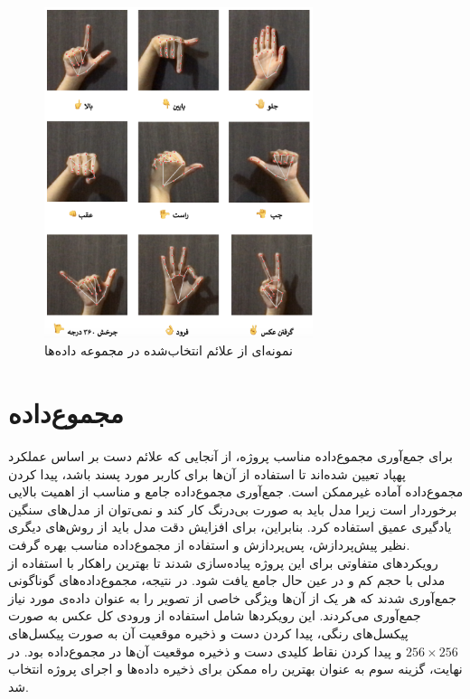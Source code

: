 \begin{figure}[h]
    \centering
    \includegraphics[width=0.7\textwidth]{gestures.png}
    \caption{نمونه‌ای از علائم انتخاب‌شده در مجموعه داده‌ها}
    \label{t}
\end{figure}

\section[مجموع‌داده]{مجموع‌داده \protect{}}
برای جمع‌آوری مجموع‌داده مناسب پروژه، از آنجایی که علائم دست بر اساس عملکرد پهپاد تعیین شده‌اند تا استفاده از آن‌ها برای کاربر مورد پسند باشد، پیدا کردن مجموع‌داده آماده غیرممکن است. جمع‌آوری مجموع‌داده جامع و مناسب از اهمیت
 بالایی برخوردار است زیرا مدل باید به صورت بی‌درنگ کار کند و نمی‌توان از مدل‌های سنگین یادگیری عمیق استفاده کرد. بنابراین، برای افزایش دقت مدل باید از روش‌های دیگری نظیر پیش‌پردازش، پس‌پردازش و استفاده از مجموع‌داده مناسب بهره گرفت.
\\
رویکردهای متفاوتی برای این پروژه پیاده‌سازی شدند تا بهترین راهکار با استفاده از مدلی با حجم کم و در عین حال جامع یافت شود. در نتیجه، مجموع‌داده‌های گوناگونی جمع‌آوری شدند که هر یک از آن‌ها ویژگی خاصی از تصویر
 را به عنوان داده‌ی مورد نیاز جمع‌آوری می‌کردند. این رویکردها شامل استفاده از ورودی کل عکس به صورت پیکسل‌های رنگی، پیدا کردن دست و ذخیره موقعیت آن به صورت پیکسل‌های $256 \times 256$ و پیدا کردن نقاط کلیدی دست و ذخیره موقعیت آن‌ها در مجموع‌داده بود. در نهایت، گزینه سوم به عنوان بهترین راه ممکن برای ذخیره داده‌ها و اجرای پروژه انتخاب شد.

